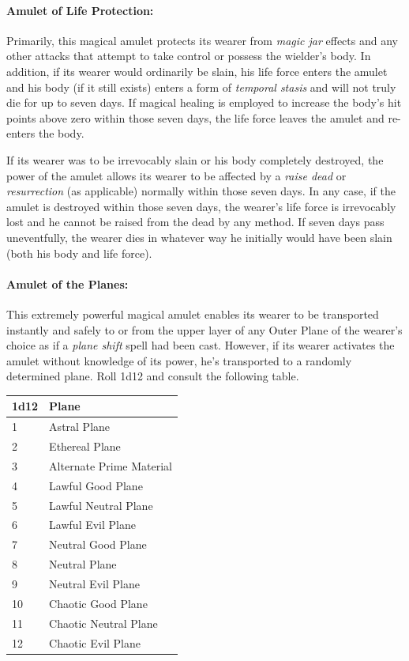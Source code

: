 \begin{multicols}{2}
\paragraph{Amulet of Life Protection:} Primarily, this magical amulet protects its wearer from \textit{magic jar} effects and any other attacks that attempt to take control or possess the wielder's body.  In addition, if its wearer would ordinarily be slain, his life force enters the amulet and his body (if it still exists) enters a form of \textit{temporal stasis} and will not truly die for up to seven days.  If magical healing is employed to increase the body's hit points above zero within those seven days, the life force leaves the amulet and re-enters the body.  

If its wearer was to be irrevocably slain or his body completely destroyed, the power of the amulet allows its wearer to be affected by a \textit{raise dead} or \textit{resurrection} (as applicable) normally within those seven days.  In any case, if the amulet is destroyed within those seven days, the wearer's life force is irrevocably lost and he cannot be raised from the dead by any method.  If seven days pass uneventfully, the wearer dies in whatever way he initially would have been slain (both his body and life force).  

\paragraph{Amulet of the Planes:} This extremely powerful magical amulet enables its wearer to be transported instantly and safely to or from the upper layer of any Outer Plane of the wearer's choice as if a \textit{plane shift} spell had been cast.  However, if its wearer activates the amulet without knowledge of its power, he's transported to a randomly determined plane.  Roll 1d12 and consult the following table.

\noindent
\begin{tabular}{|p{}|p{}|}
\hline
1d12	& Plane \\
\hline\hline
\rowcolor[gray]{.9}1	& Astral Plane \\
2	& Ethereal Plane \\
\rowcolor[gray]{.9}3	& Alternate Prime Material \\
4	& Lawful Good Plane \\
\rowcolor[gray]{.9}5	& Lawful Neutral Plane \\
6	& Lawful Evil Plane \\
\rowcolor[gray]{.9}7	& Neutral Good Plane \\
8	& Neutral Plane \\
\rowcolor[gray]{.9}9	& Neutral Evil Plane \\
10	& Chaotic Good Plane \\
\rowcolor[gray]{.9}11	& Chaotic Neutral Plane \\
12	& Chaotic Evil Plane \\
\hline
\end{tabular}


\end{multicols}
